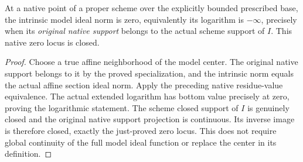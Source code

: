 \begin{theorem}
\label{scheme:native-model-ideal-zero-locus}
\leanok
{}
At a native point of a proper scheme over the explicitly bounded
prescribed base, the intrinsic model ideal norm is zero, equivalently its
logarithm is $-\infty$, precisely when its \emph{original native support}
belongs to the actual scheme support of $I$. This native zero locus is
closed.
\end{theorem}
\begin{proof}
Choose a true affine neighborhood of the model center. The original
native support belongs to it by the proved specialization, and the intrinsic
norm equals the actual affine section ideal norm. Apply the preceding
native residue-value equivalence. The actual extended logarithm has
bottom value precisely at zero, proving the logarithmic statement. The
scheme closed support of $I$ is genuinely closed and the original native
support projection is continuous. Its inverse image is therefore closed,
exactly the just-proved zero locus. This does not require global continuity
of the full model ideal function or replace the center in its definition.
\end{proof}

